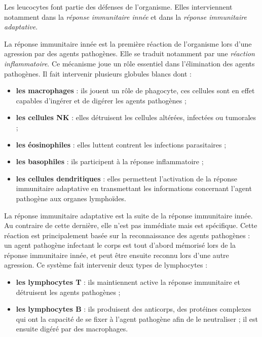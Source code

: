 \documentclass[12pt]{article}
\begin{document}
	Les leucocytes font partie des défenses de l'organisme. Elles interviennent notamment dans la \textit{réponse immunitaire innée} et dans la \textit{réponse immunitaire adaptative}.
	
	La réponse immunitaire innée est la première réaction de l'organisme lors d'une agression par des agents pathogènes. Elle se traduit notamment par une \textit{réaction inflammatoire}. Ce mécanisme joue un rôle essentiel dans l'élimination des agents pathogènes. Il fait intervenir plusieurs globules blancs dont :
	\begin{itemize}
	\item \textbf{les macrophages} : ils jouent un rôle de phagocyte, ces cellules sont en effet capables d'ingérer et de digérer les agents pathogènes ;
	\item \textbf{les cellules NK} : elles détruisent les cellules altérées, infectées ou tumorales ;
	\item \textbf{les éosinophiles} : elles luttent contrent les infections parasitaires ;
	\item \textbf{les basophiles} :  ils participent à la réponse inflammatoire ;
	\item \textbf{les cellules dendritiques} : elles permettent l'activation de la réponse immunitaire adaptative en transmettant les informations concernant l'agent pathogène aux organes lymphoïdes.
	\end{itemize}
	
	La réponse immunitaire adaptative est la suite de la réponse immunitaire innée. Au contraire de cette dernière, elle n'est pas immédiate mais est spécifique. Cette réaction est principalement basée sur la reconnaissance des agents pathogènes  : un agent pathogène infectant le corps est tout d'abord mémorisé lors de la réponse immunitaire innée, et peut être ensuite reconnu lors d'une autre agression. Ce système fait intervenir deux types de lymphocytes :
	\begin{itemize}
	\item \textbf{les lymphocytes T} : ils maintiennent active la réponse immunitaire et détruisent les agents pathogènes ;
	\item \textbf{les lymphocytes B} : ils produisent des anticorps, des protéines complexes qui ont la capacité de se fixer à l'agent pathogène afin de le neutraliser ; il est ensuite digéré par des macrophages.
	\end{itemize}
	
\end{document}
